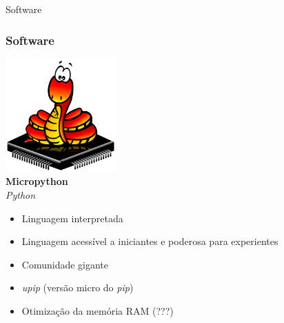 \documentclass[10pt, compress]{beamer}
\begin{document}
\begin{frame}{Software}
  \frametitle{Software}
    \begin{center}
      \includegraphics[width=120pt]{images/micropython.png}\\
      \textbf{Micropython}\\
      \textit{Python}\\
      \begin{itemize}
        \item Linguagem interpretada
        \item Linguagem acessível a iniciantes e poderosa para experientes
        \item Comunidade gigante
        \item \textit{upip} (versão micro do \textit{pip})
        \item Otimização da memória RAM (???)
      \end{itemize}
    \end{center}
\end{frame}
\end{document}
